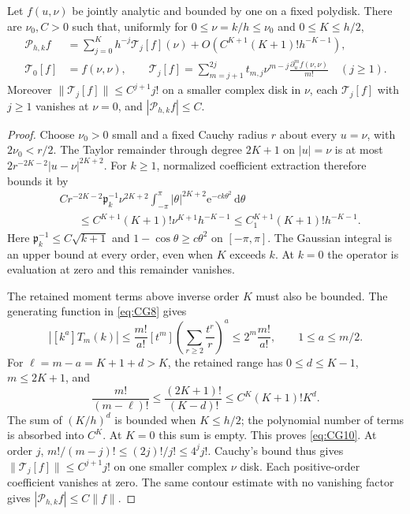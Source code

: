 \begin{lemma}\label{lem:poisson-central}
Let $f(u,\nu)$ be jointly analytic and bounded by one on a fixed polydisk.
There are $\nu_0,C>0$ such that, uniformly for $0\le\nu=k/h\le\nu_0$ and
$0\le K\le h/2$,
\begin{equation}
 \begin{split}
 \mathscr P_{h,k}f&=\sum_{j=0}^Kh^{-j}\mathscr T_j[f](\nu)
       +O\!\left(C^{K+1}(K+1)!h^{-K-1}\right),\\
 \mathscr T_0[f]&=f(\nu,\nu),\qquad
 \mathscr T_j[f]=\sum_{m=j+1}^{2j}
 t_{m,j}\nu^{m-j}\frac{\partial_u^mf(\nu,\nu)}{m!}\quad(j\ge1).
 \end{split}
 \label{eq:CG10}
\end{equation}
Moreover $\|\mathscr T_j[f]\|\le C^{j+1}j!$ on a smaller complex disk in
$\nu$, each $\mathscr T_j[f]$ with $j\ge1$ vanishes at $\nu=0$, and
$|\mathscr P_{h,k}f|\le C$.
\end{lemma}

\begin{proof}
Choose $\nu_0>0$ small and a fixed Cauchy radius $r$ about every
$u=\nu$, with $2\nu_0<r/2$. The Taylor remainder through degree
$2K+1$ on $|u|=\nu$ is at most
$2r^{-2K-2}|u-\nu|^{2K+2}$.
For $k\ge1$, normalized coefficient extraction therefore bounds it by
\begin{equation}
 \begin{split}
 &Cr^{-2K-2}\mathfrak p_k^{-1}\nu^{2K+2}
   \int_{-\pi}^{\pi}|\theta|^{2K+2}\mathrm{e}^{-ck\theta^2}\,\mathrm{d}\theta\\
 &\hspace{20pt}\le C^{K+1}(K+1)!\nu^{K+1}h^{-K-1}
       \le C_1^{K+1}(K+1)!h^{-K-1}.
 \end{split}
 \label{eq:CG9}
\end{equation}
Here $\mathfrak p_k^{-1}\le C\sqrt{k+1}$ and
$1-\cos\theta\ge c\theta^2$ on $[-\pi,\pi]$.
The Gaussian integral is an upper bound at every order, even when
$K$ exceeds $k$. At $k=0$ the operator is evaluation at zero and
this remainder vanishes.

The retained moment terms above inverse order $K$ must also be bounded.
The generating function in \eqref{eq:CG8} gives
\[
 |[k^a]T_m(k)|\le\frac{m!}{a!}
 [t^m]\left(\sum_{r\ge2}\frac{t^r}{r}\right)^a
 \le2^m\frac{m!}{a!},\qquad 1\le a\le m/2.
\]
For $\ell=m-a=K+1+d>K$, the retained range has
$0\le d\le K-1$, $m\le2K+1$, and
\[
 \frac{m!}{(m-\ell)!}\le\frac{(2K+1)!}{(K-d)!}
       \le C^K(K+1)!K^d.
\]
The sum of $(K/h)^d$ is bounded when $K\le h/2$; the polynomial
number of terms is absorbed into $C^K$. At $K=0$ this sum is empty.
This proves \eqref{eq:CG10}. At order $j$, $m!/(m-j)!\le(2j)!/j!\le4^jj!$.
Cauchy's bound thus gives
$\|\mathscr T_j[f]\|\le C^{j+1}j!$ on one smaller complex
$\nu$ disk. Each positive-order coefficient vanishes at zero.
The same contour estimate with no vanishing factor gives
$|\mathscr P_{h,k}f|\le C\|f\|$.
\end{proof}



